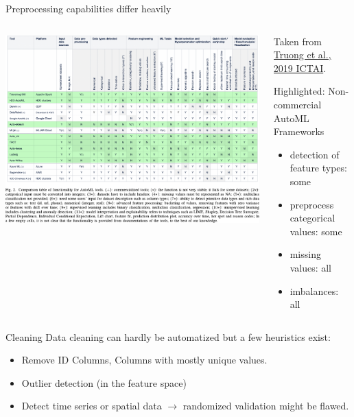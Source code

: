 \begin{frame}{Preprocessing capabilities differ heavily}
  \begin{columns}
    \begin{column}{0.6\textwidth}
      \vspace*{-1cm}
      \begin{center}
        \includegraphics[width = \linewidth]{images/Truong2019Towards_fig2.pdf}
      \end{center}
    \end{column}%
    \begin{column}{0.3\textwidth}
    \small
      Taken from \href{https://doi.org/10.1109/ICTAI.2019.00209}{Truong et al., 2019 ICTAI}.
      \vspace{1em}

      Highlighted: Non-commercial AutoML Frameworks

      \begin{itemize}
        \item detection of feature types: some
        \item preprocess categorical values: some
        \item missing values: all
        \item imbalances: all
      \end{itemize}
    \end{column}
  \end{columns}
\end{frame}

\begin{frame}{Cleaning}
  Data cleaning can hardly be automatized but a few heuristics exist:
  \begin{itemize}
    \item Remove ID Columns, Columns with mostly unique values.
    \item Outlier detection (in the feature space)
    \item Detect time series or spatial data $\rightarrow$ randomized validation might be flawed.
  \end{itemize}
\end{frame}

